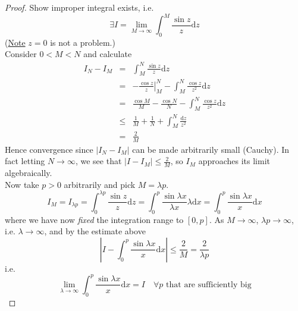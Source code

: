 \documentclass[12pt]{report}
\theoremstyle{definition}
\begin{document}
\begin{proof}
    Show improper integral exists, i.e. \[
        \exists I = \lim_{M \rightarrow \infty} \int_{0}^{M} \frac{\sin{z}}{z}\mathrm{d}z
    \] 
    (\underline{Note} $z = 0$ is not a problem.)
    \\Consider $0 < M < N$ and calculate
    \begin{eqnarray*}
        I_N - I_M &=& \int_{M}^{N} \frac{\sin{z}}{z}\mathrm{d}z \\
                  &=& -\left.\frac{\cos{z}}{z}\right|_M^{N} - \int_{M}^{N} \frac{\cos{z}}{z^{2}}\mathrm{d}z \\
                  &=& \frac{\cos{M}}{M} - \frac{\cos{N}}{N} - \int_{M}^{N} \frac{\cos{z}}{z^{2}}\mathrm{d}z \\
                  &\le& \frac{1}{M} + \frac{1}{N} + \int_{M}^{N} \frac{\mathrm{d}z}{z^{2}} \\
                  &=& \frac{2}{M}
    \end{eqnarray*}
    Hence convergence since $|I_N - I_M|$ can be made arbitrarily small (Cauchy).
    In fact letting $N \rightarrow \infty$, we see that $|I - I_M| \le \frac{2}{M}$,
    so $I_M$ approaches its limit algebraically.
    \\Now take $p > 0$ arbitrarily and pick $M = \lambda p$.\[
        I_M = I_{\lambda p} = \int_{0}^{\lambda p} \frac{\sin{z}}{z}\mathrm{d}z
        = \int_{0}^{p} \frac{\sin{\lambda x}}{\lambda x} \lambda\mathrm{d}x
        = \int_{0}^{p} \frac{\sin{\lambda x}}{x}\mathrm{d}x
    \]
    where we have now \emph{fixed} the integration range to $[0,p]$.
    As $M \rightarrow \infty$, $\lambda p \rightarrow \infty$, i.e. $\lambda \rightarrow \infty$,
    and by the estimate above \[
        \left|I - \int_{0}^{p} \frac{\sin{\lambda x}}{x}\mathrm{d}x\right| \le \frac{2}{M} = \frac{2}{\lambda p}
    \]
    i.e. 
    \begin{equation}
        \lim_{\lambda \rightarrow \infty} \int_{0}^{p} \frac{\sin{\lambda x}}{x}\mathrm{d}x = I \quad 
        \forall p \text{\ that are sufficiently big} \label{eq:3}
    \end{equation}
    

\end{proof}
\end{document}

